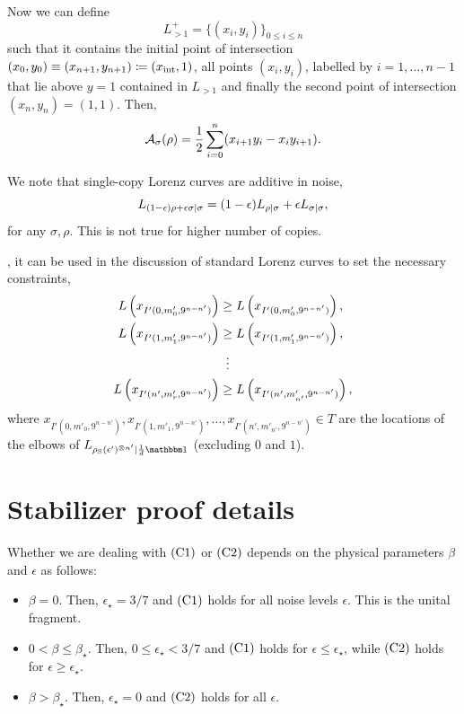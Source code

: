 \documentclass[pra,
aps,
twocolumn,
superscriptaddress,
groupedaddress,
nofootinbib,
reprint
]{revtex4-1}
\begin{document}
Now we can define
\begin{equation}
L_{>1}^+ = \{ (x_i, y_i) \}_{0 \leq i \leq n}
\end{equation}
such that it contains the initial point of intersection $(x_0, y_0) \equiv (x_{n+1}, y_{n+1}) \coloneqq (x_{\rm{int}}, 1)$, all points $(x_i, y_i)$, labelled by $i=1,\dots,n-1$ that lie above $y=1$ contained in $L_{>1}$ and finally the second point of intersection $(x_n, y_n) = (1,1)$.
Then, 
\begin{equation}
	{\mathcal A}_\sigma(\rho) = \frac{1}{2} \sum\limits_{i=0}^n (x_{i+1} y_i - x_i y_{i+1}).
\end{equation}

We note that single-copy Lorenz curves are additive in noise, 
\begin{equation}
	{L_{(1-\epsilon)\rho + \epsilon\sigma|\sigma}} = (1-\epsilon){L_{\rho|\sigma}} + \epsilon{L_{\sigma|\sigma}},
\end{equation}
for any $\sigma, \rho$.
This is not true for higher number of copies.

, it can be used in the discussion of standard Lorenz curves to set the necessary constraints,
\begin{align}
L\left(x_{I'(0, m'_{0}, 9^{n-n'})}\right) &\geq L\left(x_{I'(0, m'_{0}, 9^{n-n'})}\right), \nonumber\\
L\left(x_{I'(1, m'_{1}, 9^{n-n'})}\right) &\geq L\left(x_{I'(1, m'_{1}, 9^{n-n'})}\right), \nonumber\\
&\vdotswithin{=} \nonumber\\
L\left(x_{I'(n', m'_{r}, 9^{n-n'})}\right) &\geq L\left(x_{I'(n', m'_{n'}, 9^{n-n'})}\right), \nonumber
\end{align}
where $x_{I'(0, m'_{0}, 9^{n - n'})}, x_{I'(1, m'_{1}, 9^{n - n'})}, \dots, x_{I'(n', m'_{n'}, 9^{n - n'})} \in T$ are the locations of the elbows of $\lc{\rho_{\rm{S}}(\epsilon')^{\otimes n'}}{\frac{1}{d}\id}$ (excluding $0$ and $1$).

\null\newpage

\section{Stabilizer proof details}

Whether we are dealing with $\rm{(C1)}$ or $\rm{(C2)}$ depends on the physical parameters $\beta$ and $\epsilon$ as follows:
\begin{itemize}
	\item $\beta = 0$. Then, $\epsilon_{\star} = 3/7$ and $\rm{(C1)}$ holds for all noise levels $\epsilon$.
	This is the unital fragment.
	\item $0 < \beta \leq \beta_{\star}$. Then, $0 \leq \epsilon_{\star} < 3/7$ and $\rm{(C1)}$ holds for $\epsilon \leq \epsilon_{\star}$, while $\rm{(C2)}$ holds for $\epsilon \geq \epsilon_{\star}$.
	\item $\beta > \beta_{\star}$. Then, $ \epsilon_{\star} = 0$ and $\rm{(C2)}$ holds for all $\epsilon$.
\end{itemize}
\end{document}
